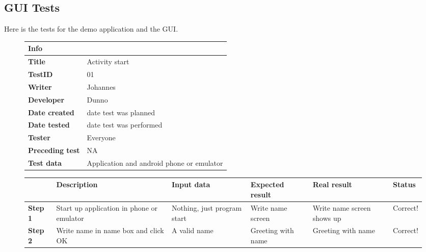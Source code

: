 \subsection{GUI Tests}
Here is the tests for the demo application and the GUI.
\begin{figure}[H]
\small

\begin{tabularx}{\textwidth }{|l|X|}
\hline
\cellcolor{blue!25}\textbf{Info} & \cellcolor{blue!25}\\
\hline
\textbf{Title} &Activity start\\
\hline
\textbf{TestID} & 01\\
\hline
\textbf{Writer}& Johannes\\
\hline
\textbf{Developer}& Dunno\\
\hline
\textbf{Date created}& date test was planned\\
\hline
\textbf{Date tested}& date test was performed\\
\hline
\textbf{Tester}& Everyone\\
\hline
\textbf{Preceding test}& NA\\
\hline
\textbf{Test data} & Application and android phone or emulator \\
\hline
\end{tabularx}

\begin{tabularx}{\textwidth}{|X|X|X|X|X|X|}
\hline
\cellcolor{blue!25}&
\cellcolor{blue!25}Description&
\cellcolor{blue!25}Input data&
\cellcolor{blue!25}Expected result&
\cellcolor{blue!25}Real result&
\cellcolor{blue!25}Status\\
\hline
\textbf{Step 1} & Start up application in phone or emulator & Nothing, just program start & Write name screen & Write name screen shows up & Correct!\\
\hline
\textbf{Step 2} & Write name in name box and click OK & A valid name & Greeting with name & Greeting with name & Correct!\\
\hline
\end{tabularx}
\label{fig:test01}
\end{figure}

